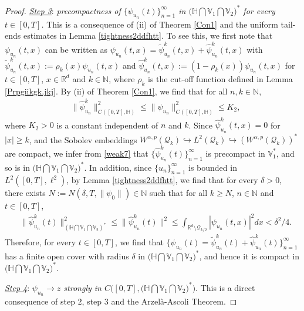 \documentclass[11pt]{article}
\renewcommand{\leq}{\leqslant}
\renewcommand{\geq}{\geqslant}  %
\numberwithin{equation}{section}
\begin{document}
\begin{proof}
\underline{\emph{Step 3}}: \emph{precompactness of $
\{\psi_{u_n}(t)\}_{n=1}^\infty$ in
$\big(\mathbb{H}\bigcap\mathbb{V}_1
\bigcap\mathbb{V}_2\big)^*$ for every $t\in[0,T]$.} This is a consequence of (ii) of Theorem \ref{Con1} and the uniform tail-ends estimates in
Lemma \ref{tightness2ddfhtt}. To see this, we first note that
$\psi_{u_n}(t,x)$ can be written as $\psi_{u_n}(t,x)=\widetilde{\psi}_{u_n}^k
(t,x)+
\widehat{\psi}_{u_n}^k(t,x)$ with
$\widetilde{\psi}_{u_n}^k(t,x):=\rho_k(x)
\psi_{u_n}(t,x)$ and $\widehat{\psi}_{u_n}^k(t,x):=(1-\rho_k(x))
\psi_{u_n}(t,x)$ for $t\in[0,T]$, $x\in\mathbb{R}^d$ and $k\in\mathbb{N}$, where
$\rho_k$ is the cut-off function defined in Lemma \ref{Prpgiikgk.jkj}.
By (ii) of Theorem \ref{Con1}, we find that for all $n,k\in\mathbb{N}$,
\begin{align}\label{weak7}
&\|\widehat{\psi}_{u_n}^k
\|^2_{C([0,T],\mathbb{H} )}\leq\|\psi_{u_n}
\|^2_{C([0,T],\mathbb{H} )}\leq K_2,
\end{align}
where $K_2>0$ is a constant independent of $n$ and $k$. Since $\widehat{\psi}_{u_n}^k(t,x)=0$
for $|x|\geq k$, and the Sobolev embeddings
$W^{\alpha,p}(\mathcal{Q}_k)\hookrightarrow L^2(\mathcal{Q}_k)\hookrightarrow (W^{\alpha,p}(\mathcal{Q}_k))^*$ are compact, we infer from \eqref{weak7}
that $\{\widehat{\psi}_{u_n}^k(t)\}_{n=1}^\infty$ is
precompact in  $\mathbb{V}_1^*$, and so
is
 in $\big(\mathbb{H}\bigcap\mathbb{V}_1
\bigcap\mathbb{V}_2\big)^*$. In addition, since $\{u_n\}_{n=1}^\infty$ is bounded in $L^2([0,T],
\ell^2)$, by Lemma \ref{tightness2ddfhtt}, we find that for every  $\delta>0$, there exists
$N:=N(\delta,T,\|\psi_0\|)
\in\mathbb{N}$ such that for all $k\geq N$, $n\in \mathbb{N}$ and $t\in[0,T]$,
\begin{align*}
& \|\widehat{\psi}_{u_n}^k(t)
\|_{(\mathbb{H}\bigcap\mathbb{V}_1
\bigcap\mathbb{V}_2)^*}^2\leq\|\widehat{\psi}_{u_n}^k(t)
\|^2\leq\int_{ {\mathbb{R}}^d \setminus
\mathcal{Q}_{k/2}}|\psi_{u_n}(t,x)|^2
dx<\delta^2/4.
\end{align*}
Therefore,  for every $t\in[0,T]$, we find that $\big\{\psi_{u_n}(t)=
\widetilde{\psi}_{u_n}^k(t)+
\widehat{\psi}_{u_n}^k(t)\big\}_{n=1}^\infty$ has a finite open cover with radius $\delta$ in
$\big(\mathbb{H}\bigcap\mathbb{V}_1
\bigcap\mathbb{V}_2\big)^*$, and hence it is compact in
$\big(\mathbb{H}\bigcap\mathbb{V}_1
\bigcap\mathbb{V}_2\big)^*$.


\underline{\emph{Step 4}}: \emph{$\psi_{u_n}\rightarrow z$ strongly in $C\big([0,T],\big(\mathbb{H}\bigcap\mathbb{V}_1
\bigcap\mathbb{V}_2\big)^*\big)$}. This is a direct consequence of step $2$, step $3$ and
the Arzel\`{a}-Ascoli Theorem.


\end{proof}
\end{document}
